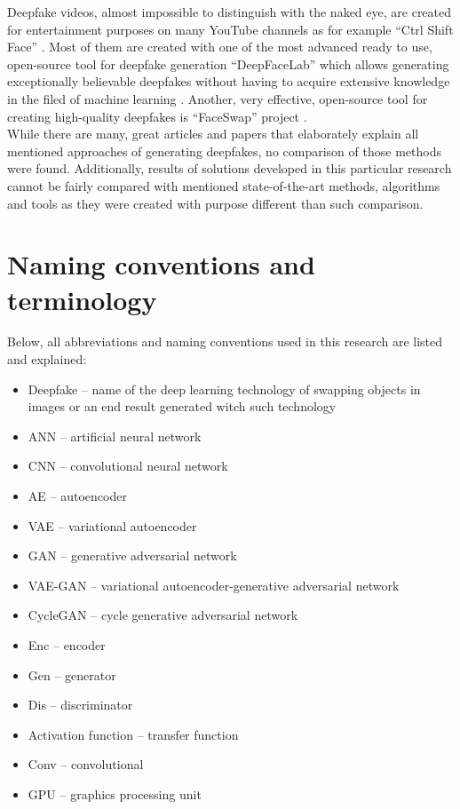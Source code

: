 Deepfake videos, almost impossible to distinguish with the naked eye, are created for entertainment purposes on many YouTube channels as for example ``Ctrl Shift Face'' \cite{ctrl_shift_face_bib}. Most of them are created with one of the most advanced ready to use, open-source tool for deepfake generation ``DeepFaceLab'' which allows generating exceptionally believable deepfakes without having to acquire extensive knowledge in the filed of machine learning \cite{DeepFaceLab_bib}. Another, very effective, open-source tool for creating high-quality deepfakes is ``FaceSwap'' project \cite{faceswap_bib}.\\

While there are many, great articles and papers that elaborately explain all mentioned approaches of generating deepfakes, no comparison of those methods were found. Additionally, results of solutions developed in this particular research cannot be fairly compared with mentioned state-of-the-art methods, algorithms and tools as they were created with purpose different than such comparison.

\section{Naming conventions and terminology}
Below, all abbreviations and naming conventions used in this research are listed and explained:

\begin{itemize}
\item Deepfake -- name of the deep learning technology of swapping objects in images or an end result generated witch such technology
\item ANN -- artificial neural network
\item CNN -- convolutional neural network
\item AE -- autoencoder
\item VAE -- variational autoencoder
\item GAN -- generative adversarial network
\item VAE-GAN -- variational autoencoder-generative adversarial network
\item CycleGAN -- cycle generative adversarial network
\item Enc -- encoder
\item Gen -- generator
\item Dis -- discriminator
\item Activation function -- transfer function
\item Conv -- convolutional
\item GPU -- graphics processing unit
\end{itemize}